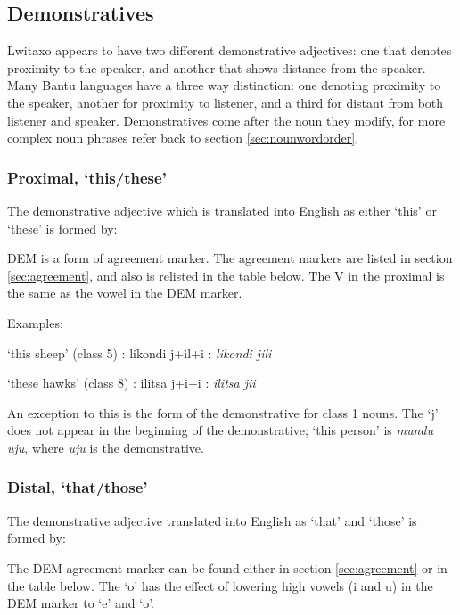 \subsection{Demonstratives} \label{sec:demon}
Lwitaxo appears to have two different demonstrative adjectives: one that denotes proximity to the speaker, and another that shows distance from the speaker.  Many Bantu languages have a three way distinction: one denoting proximity to the speaker, another for proximity to listener, and a third for distant from both listener and speaker.  Demonstratives come after the noun they modify, for more complex noun phrases refer back to section \ref{sec:nounwordorder}.

\subsubsection{Proximal, `this/these'}
The demonstrative adjective which is translated into English as either `this' or `these' is formed by:


DEM is a form of agreement marker.  The agreement markers are listed in section \ref{sec:agreement}, and also is relisted in the table below.  The V in the proximal is the same as the vowel in the DEM marker.

Examples:\begin{wrdex}
\item `this sheep' (class 5) : likondi j+il+i : \emph{likondi jili}
\item `these hawks' (class 8) : \beta{}ilitsa j+i\beta{}+i : \emph{\beta{}ilitsa ji\beta{}i}
\end{wrdex}

An exception to this is the form of the demonstrative for class 1 nouns.  The `j' does not appear in the beginning of the demonstrative; `this person' is \emph{mundu uju}, where \emph{uju} is the demonstrative.

\subsubsection{Distal, `that/those'}
The demonstrative adjective translated into English as `that' and `those' is formed by:


The DEM agreement marker can be found either in section \ref{sec:agreement} or in the table below.  The `o' has the effect of lowering high vowels (i and u) in the DEM marker to `e' and `o'.

